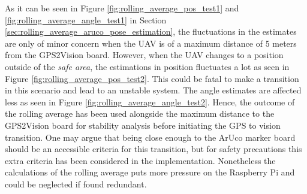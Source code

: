 \documentclass[../Head/report.tex]{subfiles}
\begin{document}
As it can be seen in Figure \ref{fig:rolling_average_pos_test1} and \ref{fig:rolling_average_angle_test1} in Section \ref{sec:rolling_average_aruco_pose_estimation}, the fluctuations in the estimates are only of minor concern when the UAV is of a maximum distance of 5 meters from the GPS2Vision board. However, when the UAV changes to a position outside of the \textit{safe area}, the estimations in position fluctuates a lot as seen in Figure \ref{fig:rolling_average_pos_test2}. This could be fatal to make a transition in this scenario and lead to an unstable system. The angle estimates are affected less as seen in Figure \ref{fig:rolling_average_angle_test2}. Hence, the outcome of the rolling average has been used alongside the maximum distance to the GPS2Vision board for stability analysis before initiating the GPS to vision transition. One may argue that being close enough to the ArUco marker board should be an accessible criteria for this transition, but for safety precautions this extra criteria has been considered in the implementation. Nonetheless the calculations of the rolling average puts more pressure on the Raspberry Pi and could be neglected if found redundant.     
\end{document}
